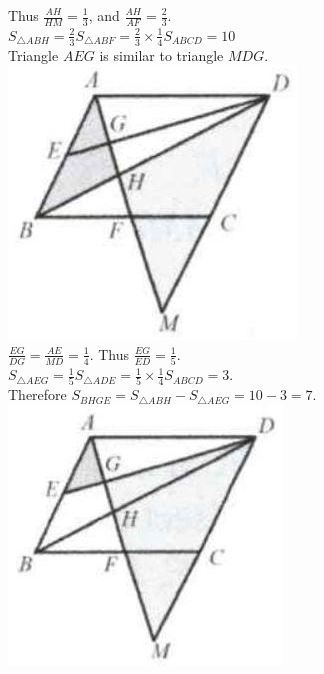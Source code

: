 \documentclass[10pt]{article}
\begin{document}
Thus \(\frac{A H}{H M}=\frac{1}{3}\), and \(\frac{A H}{A F}=\frac{2}{3}\).\\
\(S_{\triangle A B H}=\frac{2}{3} S_{\triangle A B F}=\frac{2}{3} \times \frac{1}{4} S_{A B C D}=10\)\\
Triangle \(A E G\) is similar to triangle \(M D G\).\\
\includegraphics[max width=\textwidth, center]{2025_04_17_97bc1f7e44d93c271a88g-141}\\
\(\frac{E G}{D G}=\frac{A E}{M D}=\frac{1}{4}\). Thus \(\frac{E G}{E D}=\frac{1}{5}\).\\
\(S_{\triangle A E G}=\frac{1}{5} S_{\triangle A D E}=\frac{1}{5} \times \frac{1}{4} S_{A B C D}=3\).\\
Therefore \(S_{B H G E}=S_{\triangle A B H}-S_{\triangle A E G}=10-3=7\).\\
\includegraphics[max width=\textwidth, center]{2025_04_17_97bc1f7e44d93c271a88g-141(1)}
\end{document}
